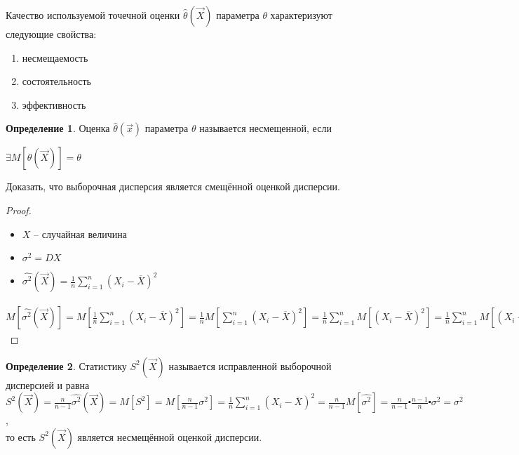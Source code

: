 \documentclass[a4paper, 12pt]{article}
\theoremstyle{definition}
\newtheorem{definition}{Определение}[section]
\theoremstyle{leads}
\theoremstyle{example}
\begin{document}
Качество используемой точечной оценки $\hat{\theta}(\vec{X})$ параметра $\theta$ характеризуют следующие свойства:
\begin{enumerate}
	\item несмещаемость
	\item состоятельность 
	\item эффективность
\end{enumerate}

\begin{definition}
	Оценка $\hat{\theta}(\vec{x})$ параметра $\theta$ называется несмещенной, если 
	\begin{center}
		\centering $\exists M[\hat{\theta}(\vec{X})] = \theta$
	\end{center}
\end{definition}

Доказать, что выборочная дисперсия является смещённой оценкой дисперсии.
\begin{proof}
	\begin{itemize}
		\item $X$ -- случайная величина
		\item $\sigma^2 = DX$
		\item $\hat{\sigma^2}(\vec{X}) = \frac{1}{n} \sum_{i=1}^{n} (X_i - \overline{X})^2$
	\end{itemize}
$M[\hat{\sigma^2}(\vec{X})] = M[\frac{1}{n}  \sum_{i=1}^{n} (X_i - \overline{X})^2] = \frac{1}{n} M[ \sum_{i=1}^{n} (X_i - \overline{X})^2] = \frac{1}{n} \sum_{i=1}^{n} M[(X_i - \overline{X})^2] = \frac{1}{n}  \sum_{i=1}^{n} M[(X_i - \sum_{i=1}^{n}X_j)^2] = \sum_{i=1}^{n} M[((X_i - m) - \frac{1}{n} \sum_{j=1}^{n}(X_j - m))^2] = \frac{1}{n} \sum_{i=1}^{n} M [(X_i - m)^2 - \frac{2}{n} \sum_{i=1}^{n}(X_j - m)(X_i - m) + \frac{1}{n^2} (\sum_{j=1}^{n}(X_j - m) )^2] = \frac{1}{n} \sum_{i=1}^{n}\{M [(X_i - m)^2] - \frac{2}{n} \sum_{j=1}^{n} M[(X_i - m)(X_j - m)] + \frac{1}{n^2} \sum_{j=1}^{n} M [(X_j - m)^2 + \frac{1}{n^2} \sum_{j,k=1, k \neq j}^{n}M[(X_k - m)(X_j - m)]] = \frac{1}{n} \sum_{i=1}^{n}\{ \sigma^2 - \frac{2}{n} \sigma^2 + \frac{1}{n^2} \sum_{j=1}^{n} \sigma^2\} = \frac{1}{n} \centerdot n \{ \sigma^2 - \frac{2}{n} \sigma^2 + \frac{1}{n} \sigma^2\} = \sigma^2 - \frac{1}{n} \sigma^2 = \sigma^2 (1 - \frac{1}{n}) = \sigma^2 \frac{n - 1}{n} \neq \sigma^2$
\end{proof}
\begin{definition}
	Статистику $S^2(\vec{X})$ называется исправленной выборочной дисперсией и равна\\
		$S^2(\vec{X}) = \frac{n}{n - 1} \hat{\sigma^2}(\vec{X}) = M[S^2] = M[\frac{n}{n - 1} \sigma^2] = \frac{1}{n} \sum_{i=1}^{n} (X_i - \overline{X})^2 = \frac{n}{n - 1} M[\hat{\sigma^2}] = \frac{n}{n - 1} \centerdot\frac{n - 1}{n} \centerdot\sigma^2 = \sigma^2$, \\
		то есть $S^2(\vec{X})$ является несмещённой оценкой дисперсии.
\end{definition}
\end{document}
